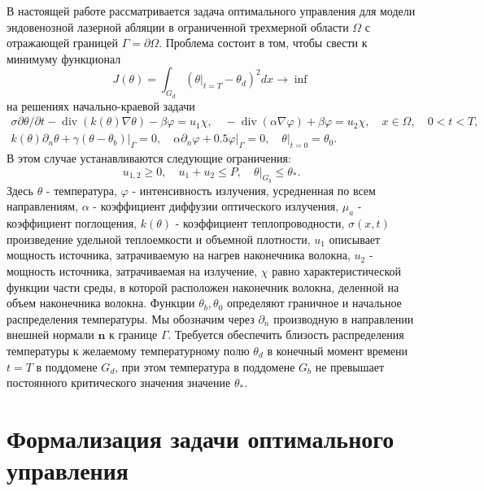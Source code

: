     В настоящей работе рассматривается задача оптимального управления для модели
    эндовенозной лазерной абляции в ограниченной трехмерной области
    $\Omega$ с отражающей границей $\Gamma=\partial\Omega$.
    Проблема состоит в том, чтобы свести к минимуму функционал
    \[
        J(\theta)=\int_{G_{d}}\left(\left.\theta\right|_{t=T}-\theta_{d}\right)^{2} d x \rightarrow \inf
    \]
    на решениях начально-краевой задачи
    \[
        \begin{gathered}
            \sigma \partial \theta / \partial t-\operatorname{div}(k(\theta) \nabla \theta)-\beta \varphi=u_{1} \chi, \quad-\operatorname{div}(\alpha \nabla \varphi)+\beta \varphi=u_{2} \chi, \quad x \in \Omega, \quad 0<t<T, \\
            k(\theta) \partial_{n} \theta+\left.\gamma\left(\theta-\theta_{b}\right)\right|_{\Gamma}=0, \quad \alpha \partial_{n} \varphi+\left.0.5 \varphi\right|_{\Gamma}=0,\left.\quad \theta\right|_{t=0}=\theta_{0} .
        \end{gathered}
    \]
    В этом случае устанавливаются следующие ограничения:
    \[
        u_{1,2} \geq 0, \quad u_{1}+u_{2} \leq P,\left.\quad \theta\right|_{G_{b}} \leq \theta_{*} .
    \]
    Здесь $\theta$ - температура, $\varphi$ - интенсивность излучения, усредненная по всем направлениям,
    $\alpha$ - коэффициент диффузии оптического излучения, $\mu_{a}$ - коэффициент поглощения,
    $k(\theta)$ - коэффициент теплопроводности, $\sigma(x, t)$ произведение удельной теплоемкости
    и объемной плотности, $u_{1}$ описывает мощность источника, затрачиваемую
    на нагрев наконечника волокна, $u_{2}$ - мощность источника, затрачиваемая на излучение,
    $\chi$ равно характеристической функции части среды, в которой расположен наконечник волокна,
    деленной на объем наконечника волокна.
    Функции $\theta_{b}, \theta_{0}$ определяют граничное и начальное распределения температуры.
    Мы обозначим через $\partial_{n}$ производную в направлении внешней нормали $\mathbf{n}$ к границе $\Gamma$.
    Требуется обеспечить близость распределения температуры к желаемому температурному полю $\theta_{d}$
    в конечный момент времени $t=T$ в поддомене $G_{d}$, при этом температура в поддомене $G_{b}$
    не превышает постоянного критического значения значение $\theta_{*}$.


    \section{Формализация задачи оптимального управления}

